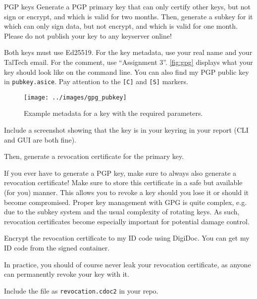 \documentclass{homework}
\begin{document}
\begin{task}{PGP keys}
  Generate a PGP primary key that can only certify other keys, but not sign or encrypt, and which is valid for two months.
  Then, generate a subkey for it which can only sign data, but not encrypt, and which is valid for one month.
  Please do not publish your key to any keyserver online!

  Both keys must use Ed25519.
  For the key metadata, use your real name and your TalTech email.
  For the comment, use \enquote{Assignment 3}.
  \autoref{fig:gpg} displays what your key should look like on the command line.
  You can also find my PGP public key in \texttt{pubkey.asice}.
  Pay attention to the \texttt{[C]} and \texttt{[S]} markers.

  \begin{figure}[h!]
    \center
    \texttt{[image: ../images/gpg\_pubkey]}
    \caption{Example metadata for a key with the required parameters.}
    \label{fig:gpg}
  \end{figure}

  Include a screenshot showing that the key is in your keyring in your report (CLI and GUI are both fine).

  Then, generate a revocation certificate for the primary key.

  \begin{tcolorbox}
    If you ever have to generate a PGP key, make sure to always also generate a revocation certificate!
    Make sure to store this certificate in a safe but available (for you) manner.
    This allows you to revoke a key should you lose it or should it become compromised.
    \tcblower
    Proper key management with GPG is quite complex, e.g. due to the subkey system and the usual complexity of rotating keys.
    As such, revocation certificates become especially important for potential damage control.
  \end{tcolorbox}

  Encrypt the revocation certificate to my ID code using DigiDoc.
  You can get my ID code from the signed container.
  \begin{tcolorbox}
    In practice, you should of course never leak your revocation certificate, as anyone can permanently revoke your key with it.
  \end{tcolorbox}

  Include the file as \texttt{revocation.cdoc2} in your repo.
\end{task}
\end{document}
